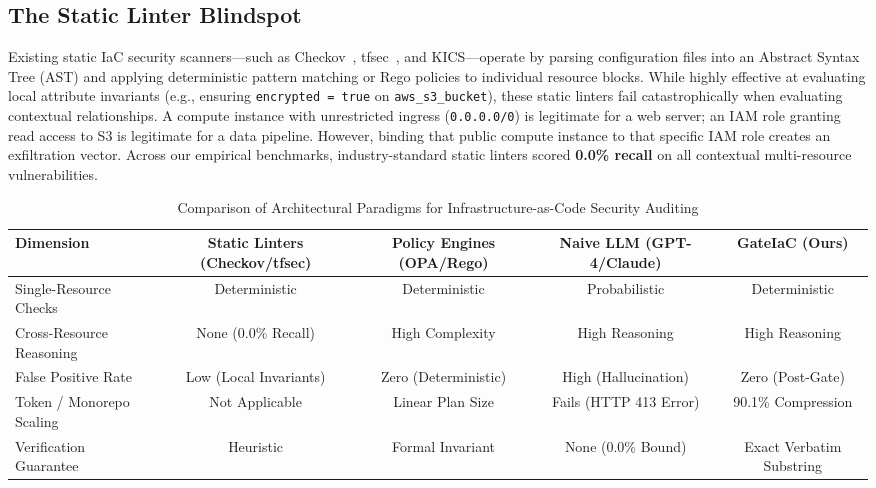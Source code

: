 \documentclass[conference]{IEEEtran}
\begin{document}
\subsection{The Static Linter Blindspot}
Existing static IaC security scanners---such as Checkov~\cite{checkov}, tfsec~\cite{tfsec}, and KICS---operate by parsing configuration files into an Abstract Syntax Tree (AST) and applying deterministic pattern matching or Rego policies to individual resource blocks. While highly effective at evaluating local attribute invariants (e.g., ensuring \texttt{encrypted = true} on \texttt{aws\_s3\_bucket}), these static linters fail catastrophically when evaluating contextual relationships. A compute instance with unrestricted ingress (\texttt{0.0.0.0/0}) is legitimate for a web server; an IAM role granting read access to S3 is legitimate for a data pipeline. However, binding that public compute instance to that specific IAM role creates an exfiltration vector. Across our empirical benchmarks, industry-standard static linters scored \textbf{0.0\% recall} on all contextual multi-resource vulnerabilities.

\begin{table}[t]
\centering
\caption{Comparison of Architectural Paradigms for Infrastructure-as-Code Security Auditing}
\label{tab:paradigm_comparison}
\begin{tabular}{lcccc}
\toprule
\textbf{Dimension} & \textbf{Static Linters (Checkov/tfsec)} & \textbf{Policy Engines (OPA/Rego)} & \textbf{Naive LLM (GPT-4/Claude)} & \textbf{GateIaC (Ours)} \\
\midrule
Single-Resource Checks & Deterministic & Deterministic & Probabilistic & Deterministic \\
Cross-Resource Reasoning & None (0.0\% Recall) & High Complexity & High Reasoning & High Reasoning \\
False Positive Rate & Low (Local Invariants) & Zero (Deterministic) & High (Hallucination) & Zero (Post-Gate) \\
Token / Monorepo Scaling & Not Applicable & Linear Plan Size & Fails (HTTP 413 Error) & 90.1\% Compression \\
Verification Guarantee & Heuristic & Formal Invariant & None (0.0\% Bound) & Exact Verbatim Substring \\
\bottomrule
\end{tabular}
\end{table}
\end{document}
